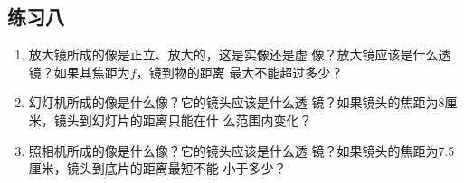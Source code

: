 \subsection{练习八}
\begin{enumerate}
    \item 放大镜所成的像是正立、放大的，这是实像还是虚
像？放大镜应该是什么透镜？如果其焦距为$f$，镜到物的距离
最大不能超过多少？

\begin{solution}

\end{solution}
\item 幻灯机所成的像是什么像？它的镜头应该是什么透
镜？如果镜头的焦距为8厘米，镜头到幻灯片的距离只能在什
么范围内变化？

\begin{solution}

\end{solution}
\item 照相机所成的像是什么像？它的镜头应该是什么透
镜？如果镜头的焦距为7.5厘米，镜头到底片的距离最短不能
小于多少？

\begin{solution}

\end{solution}
\end{enumerate}







